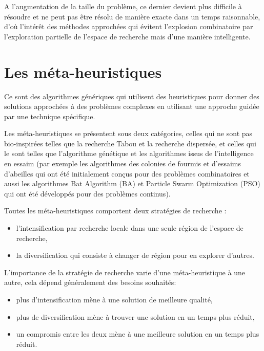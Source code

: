 A l'augmentation de la taille du problème, ce dernier devient plus difficile à résoudre et ne peut pas être résolu de manière exacte dans un temps raisonnable, d'où l'intérêt des méthodes approchées qui évitent l'explosion combinatoire par l'exploration partielle de l'espace de recherche mais d'une manière intelligente.\\

\section{Les méta-heuristiques}

Ce sont des algorithmes génériques qui utilisent des
heuristiques pour donner des solutions approchées à des problèmes
complexes en utilisant une approche guidée par une technique
spécifique.

Les méta-heuristiques se présentent sous deux catégories, celles qui
ne sont pas bio-inspirées telles que la recherche Tabou et la recherche
dispersée, et celles qui le sont telles que l’algorithme génétique et les
algorithmes issus de l’intelligence en essaim (par exemple les algorithmes des
colonies de fourmis et d'essaims d’abeilles qui ont été initialement
conçus pour des problèmes combinatoires et aussi les algorithmes Bat Algorithm (BA) et Particle Swarm Optimization (PSO) qui ont été développés pour des problèmes continus).

Toutes les méta-heuristiques comportent deux stratégies de
recherche :

\begin{itemize}
	\item l'intensification par recherche locale dans une seule région de l'espace de recherche,
	\item la diversification qui consiste à changer de région pour en explorer d'autres.
\end{itemize}

L'importance de la stratégie de recherche varie d'une méta-heuristique à une autre, cela dépend généralement des besoins souhaités:

\begin{itemize}
	\item plus d'intensification mène à une solution de meilleure qualité,
	\item plus de diversification mène à trouver une solution en un temps plus réduit,
	\item un compromis entre les deux mène à une meilleure solution en un temps plus réduit.
\end{itemize}

